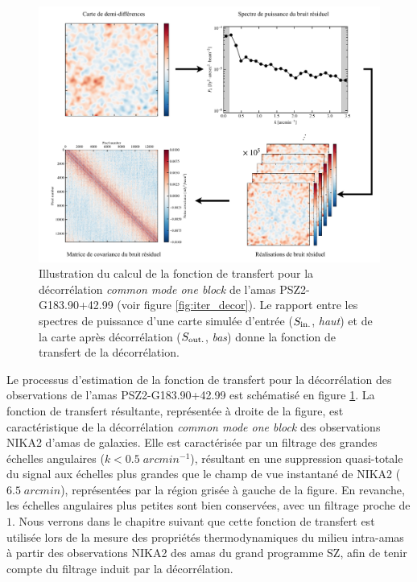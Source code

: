 \begin{figure}[t]
    \centering
    \includegraphics[width=.99\linewidth, page=2]{Figures/Chap_decor/schema_pk_tf.pdf}
    \caption{
        Illustration du calcul de la fonction de transfert pour la décorrélation \textit{common mode one block} de l'amas PSZ2-G183.90+42.99 (voir figure \ref{fig:iter_decor}).
        Le rapport entre les spectres de puissance d'une carte simulée d'entrée ($S_{\rm in.}$, \textit{haut}) et de la carte après décorrélation ($S_{\rm out.}$, \textit{bas}) donne la fonction de transfert de la décorrélation.
    }
    \label{fig:tf_schema}
\end{figure}

Le processus d'estimation de la fonction de transfert pour la décorrélation des observations de l'amas PSZ2-G183.90+42.99 est schématisé en figure \ref{fig:tf_schema}.
La fonction de transfert résultante, représentée à droite de la figure, est caractéristique de la décorrélation \textit{common mode one block} des observations NIKA2 d'amas de galaxies.
Elle est caractérisée par un filtrage des grandes échelles angulaires ($k < 0.5 \;\unit{arcmin^{-1}}$), résultant en une suppression quasi-totale du signal aux échelles plus grandes que le champ de vue instantané de NIKA2 ($6.5 \;\unit{arcmin}$), représentées par la région grisée à gauche de la figure.
En revanche, les échelles angulaires plus petites sont bien conservées, avec un filtrage proche de $1$.
Nous verrons dans le chapitre suivant que cette fonction de transfert est utilisée lors de la mesure des propriétés thermodynamiques du milieu intra-amas à partir des observations NIKA2 des amas du grand programme SZ, afin de tenir compte du filtrage induit par la décorrélation.

